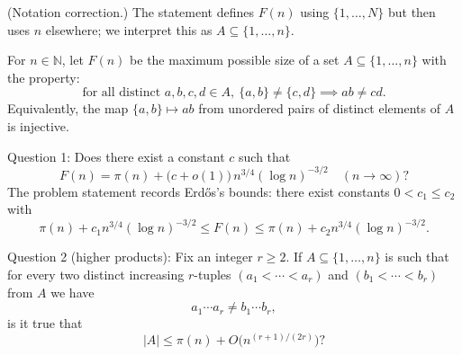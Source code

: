(Notation correction.) The statement defines $F(n)$ using $\{1,\dots,N\}$ but then uses $n$ elsewhere; we interpret this as $A\subseteq\{1,\dots,n\}$.

For $n\in\mathbb N$, let $F(n)$ be the maximum possible size of a set $A\subseteq\{1,\dots,n\}$ with the property:
\[
\text{for all distinct }a,b,c,d\in A,\ \{a,b\}\ne\{c,d\}\implies ab\ne cd.
\]
Equivalently, the map $\{a,b\}\mapsto ab$ from unordered pairs of distinct elements of $A$ is injective.

Question 1: Does there exist a constant $c$ such that
\[
F(n)=\pi(n)+\bigl(c+o(1)\bigr)\,n^{3/4}(\log n)^{-3/2}\quad (n\to\infty)?
\]
The problem statement records Erd\H{o}s’s bounds: there exist constants $0<c_1\le c_2$ with
\[
\pi(n)+c_1 n^{3/4}(\log n)^{-3/2}\le F(n)\le \pi(n)+c_2 n^{3/4}(\log n)^{-3/2}.
\]

Question 2 (higher products): Fix an integer $r\ge 2$. If $A\subseteq\{1,\dots,n\}$ is such that for every two distinct increasing $r$-tuples $(a_1<\cdots<a_r)$ and $(b_1<\cdots<b_r)$ from $A$ we have
\[
 a_1\cdots a_r\ne b_1\cdots b_r,
\]
is it true that
\[
|A|\le \pi(n)+O\bigl(n^{(r+1)/(2r)}\bigr)?
\]
